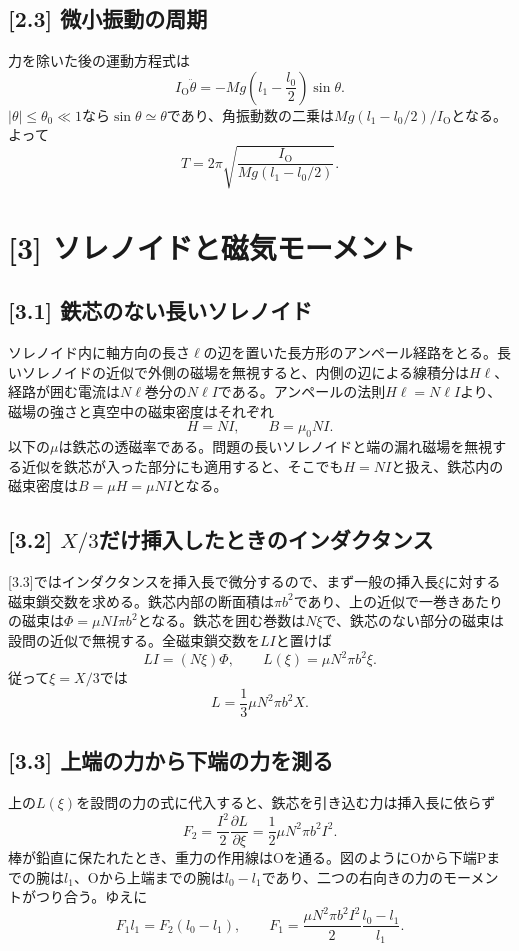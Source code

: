 \documentclass[11pt,a4paper]{article}
\begin{document}
\subsection*{[2.3] 微小振動の周期}
力を除いた後の運動方程式は
\[
 I_{\mathrm O}\ddot\theta=-Mg\left(l_1-\frac{l_0}{2}\right)\sin\theta.
\]
$|\theta|\leq\theta_0\ll1$なら$\sin\theta\simeq\theta$であり、角振動数の二乗は$Mg(l_1-l_0/2)/I_{\mathrm O}$となる。よって
\[
 \boxed{T=2\pi\sqrt{\frac{I_{\mathrm O}}{Mg(l_1-l_0/2)}}}.
\]

\section*{[3] ソレノイドと磁気モーメント}

\subsection*{[3.1] 鉄芯のない長いソレノイド}
ソレノイド内に軸方向の長さ$\ell$の辺を置いた長方形のアンペール経路をとる。長いソレノイドの近似で外側の磁場を無視すると、内側の辺による線積分は$H\ell$、経路が囲む電流は$N\ell$巻分の$N\ell I$である。アンペールの法則$H\ell=N\ell I$より、磁場の強さと真空中の磁束密度はそれぞれ
\[
 \boxed{H=NI},\qquad \boxed{B=\mu_0NI}.
\]
以下の$\mu$は鉄芯の透磁率である。問題の長いソレノイドと端の漏れ磁場を無視する近似を鉄芯が入った部分にも適用すると、そこでも$H=NI$と扱え、鉄芯内の磁束密度は$B=\mu H=\mu NI$となる。

\subsection*{[3.2] $X/3$だけ挿入したときのインダクタンス}
[3.3]ではインダクタンスを挿入長で微分するので、まず一般の挿入長$\xi$に対する磁束鎖交数を求める。鉄芯内部の断面積は$\pi b^2$であり、上の近似で一巻きあたりの磁束は$\Phi=\mu NI\pi b^2$となる。鉄芯を囲む巻数は$N\xi$で、鉄芯のない部分の磁束は設問の近似で無視する。全磁束鎖交数を$LI$と置けば
\[
 LI=(N\xi)\Phi,\qquad L(\xi)=\mu N^2\pi b^2\xi.
\]
従って$\xi=X/3$では
\[
 \boxed{L=\frac13\mu N^2\pi b^2X}.
\]

\subsection*{[3.3] 上端の力から下端の力を測る}
上の$L(\xi)$を設問の力の式に代入すると、鉄芯を引き込む力は挿入長に依らず
\[
 F_2=\frac{I^2}{2}\frac{\partial L}{\partial\xi}
 =\frac12\mu N^2\pi b^2 I^2.
\]
棒が鉛直に保たれたとき、重力の作用線はOを通る。図のようにOから下端Pまでの腕は$l_1$、Oから上端までの腕は$l_0-l_1$であり、二つの右向きの力のモーメントがつり合う。ゆえに
\[
 F_1l_1=F_2(l_0-l_1),\qquad
 \boxed{F_1=\frac{\mu N^2\pi b^2I^2}{2}\frac{l_0-l_1}{l_1}}.
\]
\end{document}
